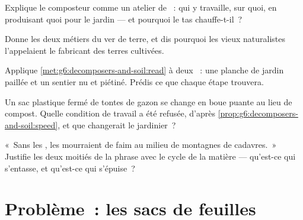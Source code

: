 \begin{exercise}[$\star\star$]\label{exo:g6:decomposers-and-soil:8}
Explique le composteur comme un atelier de ~: qui y
travaille, sur quoi, en produisant quoi pour le jardin --- et
pourquoi le tas chauffe-t-il~?
\end{exercise}

\begin{exercise}[$\star\star$]\label{exo:g6:decomposers-and-soil:9}
Donne les deux métiers du ver de terre, et dis pourquoi les vieux
naturalistes l'appelaient le fabricant des terres cultivées.
\end{exercise}

\begin{exercise}[$\star\star$]\label{exo:g6:decomposers-and-soil:10}
Applique \cref{met:g6:decomposers-and-soil:read} à deux ~: une
planche de jardin paillée et un sentier nu et piétiné. Prédis ce que
chaque étape trouvera.
\end{exercise}

\begin{exercise}[$\star\star$]\label{exo:g6:decomposers-and-soil:11}
Un sac plastique fermé de tontes de gazon se change en boue
puante au lieu de compost. Quelle condition de travail a été
refusée, d'après \cref{prop:g6:decomposers-and-soil:speed}, et que
changerait le jardinier~?
\end{exercise}

\begin{exercise}[$\star\star\star$]\label{exo:g6:decomposers-and-soil:12}
«~Sans les , les  mourraient de faim au
milieu de montagnes de cadavres.~» Justifie les deux moitiés de la
phrase avec le cycle de la matière --- qu'est-ce qui s'entasse, et
qu'est-ce qui s'épuise~?
\end{exercise}

\section{Problème~: les sacs de feuilles}

